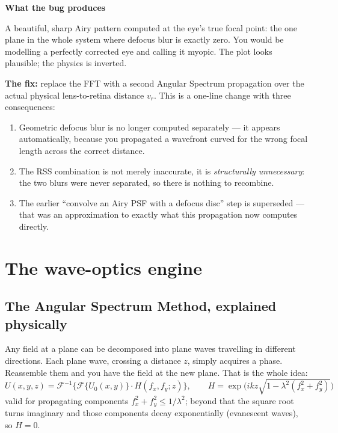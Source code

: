 \documentclass[11pt]{report}
\newenvironment{warnbox}[1]%
{\par\vspace{8pt}\begin{lrbox}{\wbsave}\begin{minipage}{0.88\textwidth}%
{\bfseries\color{warnred}#1}\par\vspace{4pt}\ignorespaces}%
{\end{minipage}\end{lrbox}%
\begin{center}\setlength{\fboxrule}{1.2pt}\setlength{\fboxsep}{8pt}%
\fcolorbox{warnred}{white}{\usebox{\wbsave}}\end{center}\vspace{8pt}\par}
\newcommand{\vr}{v_r}
\begin{document}
\begin{warnbox}{What the bug produces}
A beautiful, sharp Airy pattern computed at the eye's true focal point: the one plane in the
whole system where defocus blur is exactly zero. You would be modelling a perfectly corrected
eye and calling it myopic. The plot looks plausible; the physics is inverted.
\end{warnbox}

\textbf{The fix:} replace the FFT with a second Angular Spectrum propagation over the actual
physical lens-to-retina distance $\vr$. This is a one-line change with three consequences:

\begin{enumerate}[leftmargin=1.2cm]
\item Geometric defocus blur is no longer computed separately --- it appears automatically,
because you propagated a wavefront curved for the wrong focal length across the correct distance.
\item The RSS combination is not merely inaccurate, it is \emph{structurally unnecessary}: the two
blurs were never separated, so there is nothing to recombine.
\item The earlier ``convolve an Airy PSF with a defocus disc'' step is superseded --- that was an
approximation to exactly what this propagation now computes directly.
\end{enumerate}

\chapter{The wave-optics engine}

\section{The Angular Spectrum Method, explained physically}

Any field at a plane can be decomposed into plane waves travelling in different directions.
Each plane wave, crossing a distance $z$, simply acquires a phase. Reassemble them and you have
the field at the new plane. That is the whole idea:
\begin{equation}
U(x,y,z) = \mathcal{F}^{-1}\Big\{\mathcal{F}\{U_0(x,y)\}\cdot H(f_x,f_y;z)\Big\},
\qquad
H = \exp\!\Big(ikz\sqrt{1-\lambda^2(f_x^2+f_y^2)}\Big)
\label{eq:asm}
\end{equation}
valid for propagating components $f_x^2+f_y^2 \le 1/\lambda^2$; beyond that the square root
turns imaginary and those components decay exponentially (evanescent waves), so $H=0$.
\end{document}
